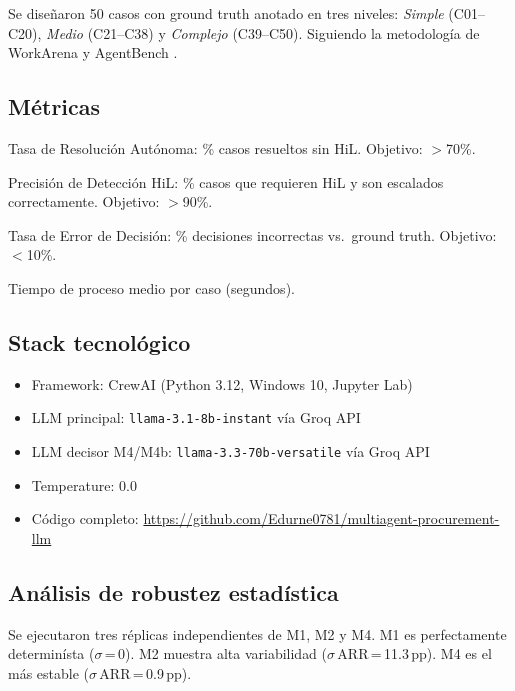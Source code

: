 \documentclass[preprint,12pt,authoryear]{elsarticle}
\begin{document}
Se dise\~naron 50 casos con ground truth anotado en tres niveles:
\emph{Simple} (C01--C20), \emph{Medio} (C21--C38) y \emph{Complejo}
(C39--C50).
Siguiendo la metodolog\'ia de WorkArena \citep{drouin2024workarena} y
AgentBench \citep{liu2023agentbench}.

\subsection{M\'etricas}

\begin{description}[leftmargin=2cm, style=sameline]
  \item[ARR] Tasa de Resoluci\'on Aut\'onoma: \% casos resueltos sin HiL.
             Objetivo: $>$70\%.
  \item[HDA] Precisi\'on de Detecci\'on HiL: \% casos que requieren HiL y
             son escalados correctamente. Objetivo: $>$90\%.
  \item[DER] Tasa de Error de Decisi\'on: \% decisiones incorrectas vs.\
             ground truth. Objetivo: $<$10\%.
  \item[PT]  Tiempo de proceso medio por caso (segundos).
\end{description}

\subsection{Stack tecnol\'ogico}

\begin{itemize}
  \item Framework: CrewAI (Python 3.12, Windows 10, Jupyter Lab)
  \item LLM principal: \texttt{llama-3.1-8b-instant} v\'ia Groq API
  \item LLM decisor M4/M4b: \texttt{llama-3.3-70b-versatile} v\'ia Groq API
  \item Temperature: 0.0
  \item C\'odigo completo: \url{https://github.com/Edurne0781/multiagent-procurement-llm}
\end{itemize}

\subsection{An\'alisis de robustez estad\'istica}

Se ejecutaron tres r\'eplicas independientes de M1, M2 y M4.
M1 es perfectamente determin\'ista ($\sigma$\,=\,0).
M2 muestra alta variabilidad ($\sigma$\,ARR\,=\,11.3\,pp).
M4 es el m\'as estable ($\sigma$\,ARR\,=\,0.9\,pp).
\end{document}
